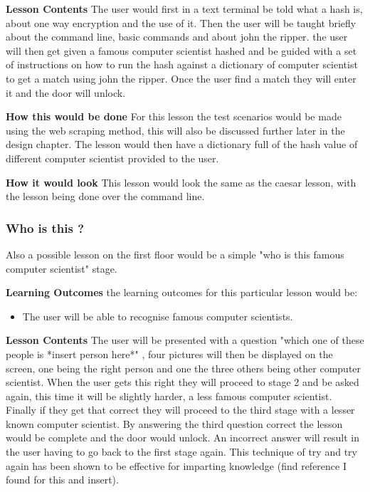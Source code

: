 \documentclass[12pt,a4paper]{article}
\begin{document}
\textbf{Lesson Contents} 
\newline The user would first in a text terminal be told what a hash is, about one way encryption and the use of it. Then the user will be taught briefly about the command line, basic commands and about john the ripper. the user will then get given a famous computer scientist hashed and be guided with a set of instructions on how to run the hash against a dictionary of computer scientist to get a match using john the ripper. Once the user find a match they will enter it and the door will unlock.

\textbf{How this would be done} 
\newline For this lesson the test scenarios would be made using the web scraping method, this will also be discussed further later in the design chapter. The lesson would then have a dictionary full of the hash value of different computer scientist provided to the user.  

\textbf{How it would look} 
This lesson would look the same as the caesar lesson, with the lesson being done over the command line.
 

\subsubsection{Who is this ?}

Also a possible lesson on the first floor would be a simple "who is this famous computer scientist" stage.  

\textbf{Learning Outcomes} 
\newline the learning outcomes for this particular lesson would be:  

\begin{itemize}\itemsep0pt
	\item The user will be able to recognise famous computer scientists.
\end{itemize} 

\textbf{Lesson Contents} 
\newline The user will be presented with a question "which one of these people is *insert person here*" , four pictures will then be displayed on the screen, one being the right person and one the three others being other computer scientist. When the user gets this right they will proceed to stage 2 and be asked again, this time it will be slightly harder, a less famous computer scientist. Finally if they get that correct they will proceed to the third stage with a lesser known computer scientist. By answering the third question correct the lesson would be complete and the door would unlock. An incorrect answer will result in the user having to go back to the first stage again. This technique of try and try again has been shown to be effective for imparting knowledge (find reference I found for this and insert). 
\end{document}

